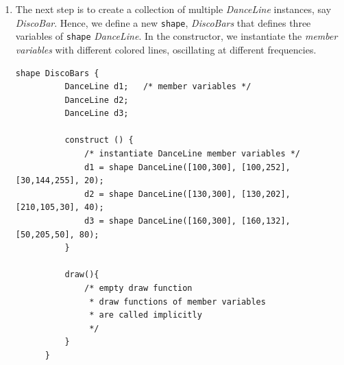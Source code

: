 \documentclass[letterpaper,12pt]{report}
\begin{document}
{\begin{enumerate}
\begin{lstlisting}[style=sol, aboveskip=1pt]
          /* drawing specification for single frame */
          draw(){
              int i;
              int [2]s;   /* control points for drawCurve */
              int [2]m;
              int [2]e;

              /* increment count on each frame */
              cnt = cnt + 1;

              if (cnt > freq) {
                  d = -d;     /* reverse direction */
                  cnt = 0;    /* reset freq counter */
              }

              /* change object length on one end */
              end[1] = end[1] + d;

              s = start;  /* end points of line */
              e = end;

              /* draw 10 bezier curves for thickness */
              i = 0;
              while (i < 10) {
                  s[0] = s[0] + 1;
                  e[0] = e[0] + 1;

                  /* bezier curve mid point */            
                  m[0] = (s[0] + e[0]) / 2;
                  m[1] = (s[1] + e[1]) / 2;

                  /* draw straight bezier curve */
                  drawCurve(s, m, e, 2, color);
                  i = i + 1;
              }
          }
      }
    \end{lstlisting}

    \item The next step is to create a collection of multiple \textit{DanceLine} instances, say \textit{DiscoBar}. Hence, we define a new \texttt{shape}, \textit{DiscoBars} that defines three variables of \texttt{shape} \textit{DanceLine}. In the constructor, we instantiate the \textit{member variables} with different colored lines, oscillating at different frequencies.\\

    \begin{lstlisting}[style=sol, aboveskip=1pt]
      shape DiscoBars {
          DanceLine d1;   /* member variables */
          DanceLine d2;
          DanceLine d3;

          construct () {
              /* instantiate DanceLine member variables */
              d1 = shape DanceLine([100,300], [100,252], [30,144,255], 20);
              d2 = shape DanceLine([130,300], [130,202], [210,105,30], 40);
              d3 = shape DanceLine([160,300], [160,132], [50,205,50], 80);
          }

          draw(){
              /* empty draw function 
               * draw functions of member variables
               * are called implicitly
               */
          }
      }
    \end{lstlisting}
  

\end{enumerate}}
\end{document}
